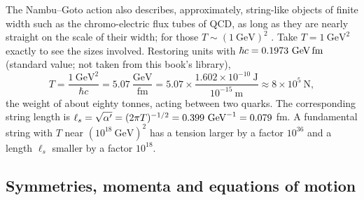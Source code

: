 \begin{example}\label{ex:classical:qcd}
The Nambu--Goto action also describes, approximately, string-like objects of finite width
such as the chromo-electric flux tubes of QCD, as long as they are nearly straight on the
scale of their width; for those $T\sim(1\ \text{GeV})^2$ .
Take $T=1\ \text{GeV}^2$ exactly to see the sizes involved. Restoring units with
$\hbar c=0.1973\ \text{GeV\,fm}$ (standard value; not taken from this book's library),
\[
  T=\frac{1\ \text{GeV}^2}{\hbar c}=5.07\ \frac{\text{GeV}}{\text{fm}}
   =5.07\times\frac{1.602\times10^{-10}\ \text{J}}{10^{-15}\ \text{m}}\approx 8\times10^{5}\ \text{N},
\]
the weight of about eighty tonnes, acting between two quarks. The corresponding string length
is $\ell_s=\sqrt{\ap}=(2\pi T)^{-1/2}=0.399\ \text{GeV}^{-1}=0.079$ fm. A fundamental string
with $T$ near $(10^{18}\ \text{GeV})^2$ has a tension larger by a factor $10^{36}$ and a
length $\ell_s$ smaller by a factor $10^{18}$.
\end{example}

\subsection{Symmetries, momenta and equations of motion}\label{sec:classical:ngeom}

